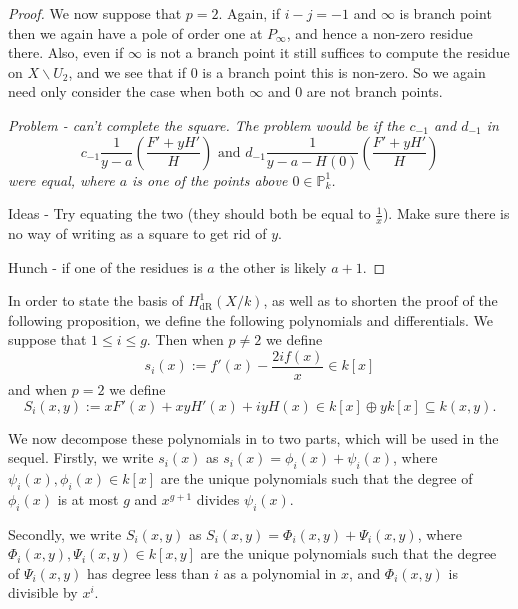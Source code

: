 \documentclass[draft, 11pt]{article} %
\theoremstyle{plain}
\theoremstyle{remark}
\newcommand{\derhamhone}{H_{\text {dR}}^1(X/k)}
\begin{document}
\begin{proof}
We now suppose that $p=2$.
Again, if $i-j=-1$ and $\infty$ is branch point then we again have a pole of order one at $P_\infty$, and hence a non-zero residue there.
Also, even if $\infty$ is not a branch point it still suffices to compute the residue on $X\backslash U_2$, and we see that if 0 is a branch point this is non-zero.
So we again need only consider the case when both $\infty$ and 0 are not branch points.


{\sl Problem - can't complete the square. The problem would be if  the $c_{-1}$ and $d_{-1}$ in 
\[
c_{-1}\frac{1}{y-a}\left(\frac{F'+yH'}{H}\right) \text{ and } d_{-1}\frac{1}{y-a-H(0)}\left(\frac{F'+yH'}{H}\right)
\]
were equal, where $a$ is one of the points above $0\in \mathbb P_k^1$.

Ideas - Try equating the two (they should both be equal to $\frac{1}{x}$).
Make sure there is no way of writing as a square to get rid of $y$.

Hunch - if one of the residues is $a$ the other is likely $a+1$.}
\end{proof}



In order to state the basis of $\derhamhone$, as well as to shorten the proof of the following proposition, we define the following polynomials and differentials. 
We suppose that $1 \leq i \leq g$.
Then when $p\neq 2$ we define
\[
s_i(x) := f'(x) - \frac{2if(x)}{x} \in k[x]
\]
and when $p = 2$ we define
\begin{equation}\label{capitals}
S_i(x,y) := xF'(x) + xyH'(x) + iyH(x)\in k[x]\oplus yk[x] \subseteq k(x,y).
\end{equation}

We now decompose these polynomials in to two parts, which will be used in the sequel.
Firstly, we write $s_i(x)$ as $s_i(x) = \phi_i(x) + \psi_i(x)$, where $\psi_i(x), \phi_i(x) \in k[x]$ are the unique polynomials such that the degree of $\phi_i (x)$ is at most $g$ and $x^{g+1}$ divides $\psi_i(x)$.



Secondly, we write $S_i(x,y)$ as $S_i(x,y) = \Phi_i(x,y) + \Psi_i(x,y)$, where $\Phi_i(x,y), \Psi_i(x,y) \in k[x,y]$ are the unique polynomials such that the degree of $\Psi_i(x,y)$ has degree less than $i$ as a polynomial in $x$, and $\Phi_i(x,y)$ is divisible by $x^i$.
\end{document}
